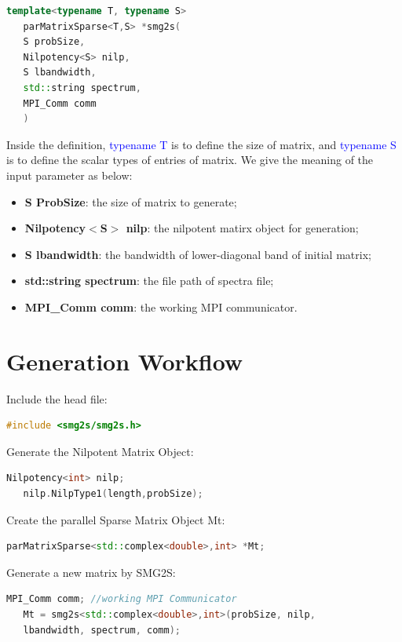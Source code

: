 \documentclass[a4paper, 10 pt]{report}
\begin{document}
	\begin{lstlisting}[language=C++,frame=single]
   template<typename T, typename S>
   parMatrixSparse<T,S> *smg2s(
   S probSize,
   Nilpotency<S> nilp,
   S lbandwidth,
   std::string spectrum,
   MPI_Comm comm
   )
	\end{lstlisting}
	
	Inside the definition, \textcolor{blue}{typename T} is to define the size of matrix, and  \textcolor{blue}{typename S} is to define the scalar types of entries of matrix. We give the meaning of the input parameter as below:
	
	\begin{itemize}
		\item \textbf{S ProbSize}: the size of matrix to generate;
		\item \textbf{Nilpotency$<$S$>$ nilp}: the nilpotent matirx object for generation;
		\item \textbf{S lbandwidth}: the bandwidth of lower-diagonal band of initial matrix;
		\item \textbf{std::string spectrum}: the file path of spectra file;
		\item \textbf{MPI\_Comm comm}: the working MPI communicator.
	\end{itemize}
	
	
	\section{Generation Workflow}
	Include the head file:
	
	\begin{lstlisting}[language=C++,frame=single]
   #include <smg2s/smg2s.h>
	\end{lstlisting}
	
	Generate the Nilpotent Matrix Object:

	\begin{lstlisting}[language=C++,frame=single]
   Nilpotency<int> nilp;
   nilp.NilpType1(length,probSize);
	\end{lstlisting}

	Create the parallel Sparse Matrix Object Mt:

	\begin{lstlisting}[language=C++,frame=single]
   parMatrixSparse<std::complex<double>,int> *Mt;
	\end{lstlisting}
	
	Generate a new matrix by SMG2S:

	\begin{lstlisting}[language=C++,frame=single]
   MPI_Comm comm; //working MPI Communicator
   Mt = smg2s<std::complex<double>,int>(probSize, nilp, 
   lbandwidth, spectrum, comm);
	\end{lstlisting}
	
\end{document}
